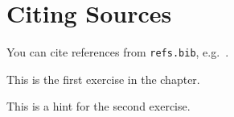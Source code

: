 \section{Citing Sources}

You can cite references from \texttt{refs.bib}, e.g.\ \cite{knuth1986texbook}.

\begin{Exercises}
\item This is the first exercise in the chapter.
\item \Hint This is a hint for the second exercise.
\end{Exercises}
